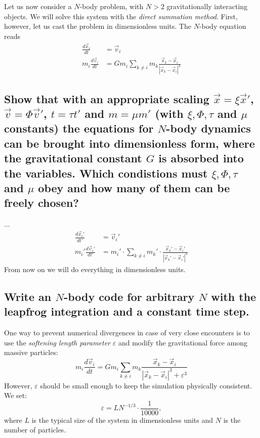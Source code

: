 Let us now consider a $N$-body problem, with $N>2$ gravitationally interacting
objects. We will solve this system with the \textit{direct summation method}.
First, however, let us cast the problem in dimensionless units. The $N$-body
equation reads
\begin{align}
    \frac{d\vec{x}_i}{dt}
    &=\vec{v}_i \\
    m_i\frac{d\vec{v}_i}{dt}
    &=Gm_i\sum_{k\neq i}m_k\frac{\vec{x}_k-\vec{x}_i}{|\vec{x}_k-\vec{x}_i|^3}
\end{align}

\subsection{Show that with an appropriate scaling $\vec x=\xi\vec x'$,
    $\vec v=\Phi\vec v'$, $t=\tau t'$ and $m=\mu m'$ (with $\xi,\Phi,\tau$
    and $\mu$ constants) the equations for $N$-body dynamics can be brought 
    into dimensionless form, where the gravitational constant $G$ is absorbed
    into the variables. Which condistions must $\xi,\Phi,\tau$ and $\mu$ obey
    and how many of them can be freely chosen?
}
    ...
    \begin{align}
        \frac{d\vec x_i'}{dt'}
        &=\vec v_i' \\
        m_i'\frac{d\vec v_i'}{dt'}
        &=m_i'\cdot\sum_{k\neq i}m_k'\cdot
        \frac{\vec x_k'-\vec x_i'}{|\vec x_k'-\vec x_i'|^3}
    \end{align}
    From now on we will do everything in dimensionless units.

\newpage
\subsection{Write an $N$-body code for arbitrary $N$ with the leapfrog 
    integration and a constant time step.
} 
    One way to prevent numerical divergences in case of very close encounters 
    is to use the \textit{softening length parameter} $\varepsilon$ and modify 
    the gravitational force among massive particles:
    \begin{equation}
        m_i\frac{d\vec v_i}{dt}
        =Gm_i\sum_{k\neq i}m_k\frac{\vec x_k-\vec x_i}
        {|\vec x_k-\vec x_i|^3 + \varepsilon^3}
    \end{equation}
    However, $\varepsilon$ should be small enough to keep the simulation 
    physically consistent. We set:
    \begin{equation}
        \varepsilon=LN^{-1/3}\cdot\frac{1}{10000},
    \end{equation}
    where $L$ is the typical size of the system in dimensionless units and 
    $N$ is the number of particles.

